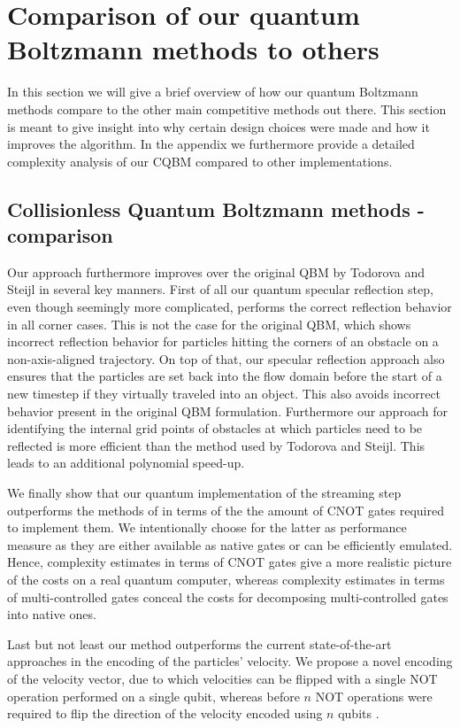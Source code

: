 \section{Comparison of our quantum Boltzmann methods to others}
In this section we will give a brief overview of how our quantum Boltzmann methods compare to the other main competitive methods out there. This section is meant to give insight into why certain design choices were made and how it improves the algorithm. In the appendix we furthermore provide a detailed complexity analysis of our CQBM compared to other implementations. 

\subsection{Collisionless Quantum Boltzmann methods - comparison}
Our approach furthermore improves over the original QBM \cite{Todorova2020} by Todorova and Steijl in several key manners. First of all our quantum specular reflection step, even though seemingly more complicated, performs the correct reflection behavior in all corner cases. This is not the case for the original QBM, which shows incorrect reflection behavior for particles hitting the corners of an obstacle on a non-axis-aligned trajectory. On top of that, our specular reflection approach also ensures that the particles are set back into the flow domain before the start of a new timestep if they virtually traveled into an object. This also avoids incorrect behavior present in the original QBM formulation.
Furthermore our approach for identifying the internal grid points of obstacles at which particles need to be reflected is more efficient than the method used by Todorova and Steijl. This leads to an additional polynomial speed-up.

We finally show that our quantum implementation of the streaming step outperforms the methods of \cite{Todorova2020, Budinski2020, Budinski2021} in terms of the the amount of CNOT gates required to implement them. We intentionally choose for the latter as performance measure as they are either available as native gates or can be efficiently emulated. Hence, complexity estimates in terms of CNOT gates give a more realistic picture of the costs on a real quantum computer, whereas complexity estimates in terms of multi-controlled gates conceal the costs for decomposing multi-controlled gates into native ones.

Last but not least our method outperforms the current state-of-the-art approaches in the encoding of the particles' velocity. We propose a novel encoding of the velocity vector, due to which velocities can be flipped with a single NOT operation performed on a single qubit, whereas before $n$ NOT operations were required to flip the direction of the velocity encoded using $n$ qubits \cite{Todorova2020}.


